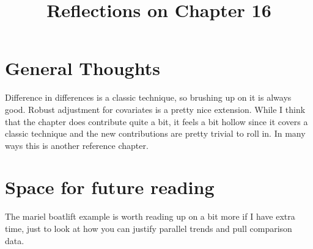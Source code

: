 \documentclass[10pt, english]{article}
\begin{document}
\title{Reflections on Chapter 16}
\date{}
\author{}

\maketitle


\section*{General Thoughts}
Difference in differences is a classic technique, so brushing up on it is always good.
Robust adjustment for covariates is a pretty nice extension. While I think that the chapter does contribute 
quite a bit, it feels a bit hollow since it covers a classic technique and the new contributions are 
pretty trivial to roll in. In many ways this is another reference chapter.

\section*{Space for future reading}
The mariel boatlift example is worth reading up on a bit more if I have extra time, just to look at how you can 
justify parallel trends and pull comparison data.
\end{document}
